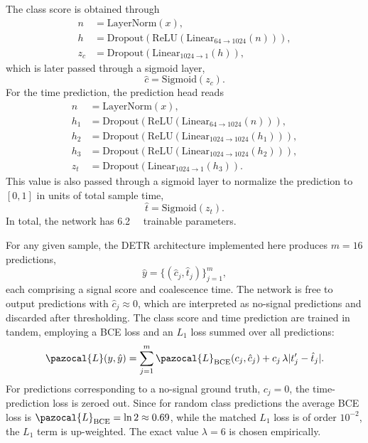 The class score is obtained through
\begin{align}
	n &= \mathrm{LayerNorm}(x),\\
	h &= \mathrm{Dropout}(\mathrm{ReLU}(\mathrm{Linear}_{64\rightarrow1024}(n))),\\
	z_c &= \mathrm{Dropout}(\mathrm{Linear}_{1024\rightarrow1}(h)),
\end{align}
which is later passed through a sigmoid layer,
\begin{equation}
	\hat c = \mathrm{Sigmoid}(z_c).
\end{equation}
For the time prediction, the prediction head reads
\begin{align}
	n &= \mathrm{LayerNorm}(x),\\
	h_1 &= \mathrm{Dropout}(\mathrm{ReLU}(\mathrm{Linear}_{64\rightarrow1024}(n))),\\
	h_2 &= \mathrm{Dropout}(\mathrm{ReLU}(\mathrm{Linear}_{1024\rightarrow1024}(h_1))),\\
	h_3 &= \mathrm{Dropout}(\mathrm{ReLU}(\mathrm{Linear}_{1024\rightarrow1024}(h_2))),\\
	z_t &= \mathrm{Dropout}(\mathrm{Linear}_{1024\rightarrow1}(h_3)).
\end{align}
This value is also passed through a sigmoid layer to normalize the prediction to $[0,1]$ in units of total sample time,
\begin{equation}
	\hat t = \mathrm{Sigmoid}(z_t).
\end{equation}
In total, the network has \SI{6.2}{\mega\nothing} trainable parameters.

For any given sample, the DETR architecture implemented here produces $m=16$ predictions,
\begin{equation}
	\hat y = \{(\hat c_j,\hat t_j)\}_{j=1}^{m},
\end{equation}
each comprising a signal score and coalescence time. The network is free to output predictions with $\hat c_j\approx0$, which are interpreted as no-signal predictions and discarded after thresholding. The class score and time prediction are trained in tandem, employing a BCE loss and an $L_1$ loss summed over all predictions:
\begin{equation}
	\pazocal{L}(y,\hat y)
	=
	\sum_{j=1}^{m}
	\pazocal{L}_\text{BCE}(c_j,\hat c_j)
	+
	c_j\,\lambda |t'_j-\hat t_j|.
	\label{eq:detr:loss}
\end{equation}
For predictions corresponding to a no-signal ground truth, $c_j=0$, the time-prediction loss is zeroed out. Since for random class predictions the average BCE loss is $\pazocal{L}_\text{BCE}=\ln 2\approx0.69$, while the matched $L_1$ loss is of order $10^{-2}$, the $L_1$ term is up-weighted. The exact value $\lambda=6$ is chosen empirically.

